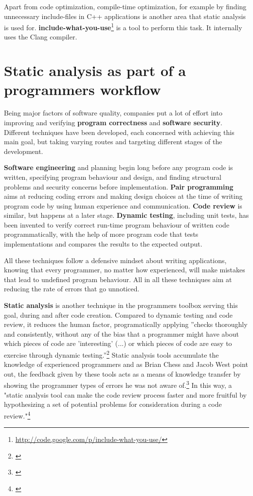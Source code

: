 Apart from code optimization, compile-time optimization, for example by finding unnecessary include-files in C++ applications is another area that static analysis is used for. \textbf{include-what-you-use}\footnote{\url{http://code.google.com/p/include-what-you-use/}} is a tool to perform this task. It internally uses the Clang compiler.

\section{Static analysis as part of a programmers workflow}

Being major factors of software quality, companies put a lot of effort into improving and verifying \textbf{program correctness} and \textbf{software security}. Different techniques have been developed, each concerned with achieving this main goal, but taking varying routes and targeting different stages of the development.

\textbf{Software engineering} and planning begin long before any program code is written, specifying program behaviour and design, and finding structural problems and security concerns before implementation. \textbf{Pair programming} aims at reducing coding errors and making design choices at the time of writing program code by using human experience and communication. \textbf{Code review} is similar, but happens at a later stage. \textbf{Dynamic testing}, including unit tests, has been invented to verify correct run-time program behaviour of written code programmatically, with the help of more program code that tests implementations and compares the results to the expected output.

All these techniques follow a defensive mindset about writing applications, knowing that every programmer, no matter how experienced, will make mistakes that lead to undefined program behaviour. All in all these techniques aim at reducing the rate of errors that go unnoticed.

\textbf{Static analysis} is another technique in the programmers toolbox serving this goal, during and after code creation. Compared to dynamic testing and code review, it reduces the human factor, programatically applying ''checks thoroughly and consistently, without any of the bias that a programmer might have about which pieces of code are 'interesting' (...) or which pieces of code are easy to exercise through dynamic testing.''\footnote{\citep[22]{SecureProgramming}} Static analysis tools accumulate the knowledge of experienced programmers and as Brian Chess and Jacob West point out, the feedback given by these tools acts as a means of knowledge transfer by showing the programmer types of errors he was not aware of.\footnote{\citep[22]{SecureProgramming}} In this way, a "static analysis tool can make the code review process faster and more fruitful by hypothesizing a set of potential problems for consideration during a code review."\footnote{\citep[13]{SecureProgramming}}

